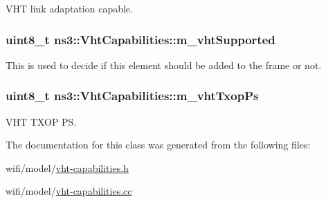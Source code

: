 V\+HT link adaptation capable. 

\subsubsection[{\texorpdfstring{m\+\_\+vht\+Supported}{m_vhtSupported}}]{\setlength{\rightskip}{0pt plus 5cm}uint8\+\_\+t ns3\+::\+Vht\+Capabilities\+::m\+\_\+vht\+Supported\hspace{0.3cm}{\ttfamily [private]}}\hypertarget{classns3_1_1VhtCapabilities_ad4477bee65f00a7b29b25adf2c9b46e2}{}\label{classns3_1_1VhtCapabilities_ad4477bee65f00a7b29b25adf2c9b46e2}


This is used to decide if this element should be added to the frame or not. 

\subsubsection[{\texorpdfstring{m\+\_\+vht\+Txop\+Ps}{m_vhtTxopPs}}]{\setlength{\rightskip}{0pt plus 5cm}uint8\+\_\+t ns3\+::\+Vht\+Capabilities\+::m\+\_\+vht\+Txop\+Ps\hspace{0.3cm}{\ttfamily [private]}}\hypertarget{classns3_1_1VhtCapabilities_a65e925626af356b9b272e673921ca919}{}\label{classns3_1_1VhtCapabilities_a65e925626af356b9b272e673921ca919}


V\+HT T\+X\+OP PS. 



The documentation for this class was generated from the following files\+:\begin{DoxyCompactItemize}
\item 
wifi/model/\hyperlink{vht-capabilities_8h}{vht-\/capabilities.\+h}\item 
wifi/model/\hyperlink{vht-capabilities_8cc}{vht-\/capabilities.\+cc}\end{DoxyCompactItemize}
